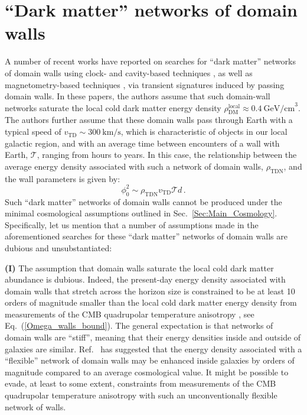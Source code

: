 \documentclass[aps,prd,onecolumn,nofootinbib]{revtex4-2} %
\begin{document}
\vspace{200mm}



\section{``Dark matter'' networks of domain walls}
\label{Sec:TDM}
A number of recent works have reported on searches for ``dark matter'' networks of domain walls using clock- and cavity-based techniques \cite{Wcislo_2016_TDM-cavity,Roberts_2017_TDM-GPS,Wcislo_2018_TDM-cavity,Roberts_2019_TDM-clocks}, as well as magnetometry-based techniques \cite{Pustelny_GNOME_2013}, via transient signatures induced by passing domain walls. 
In these papers, the authors assume that such domain-wall networks saturate the local cold dark matter energy density $\rho_\textrm{DM}^\textrm{local} \approx 0.4~\textrm{GeV/cm}^3$. 
The authors further assume that these domain walls pass through Earth with a typical speed of $v_\textrm{TD} \sim 300~\textrm{km/s}$, which is characteristic of objects in our local galactic region, and with an average time between encounters of a wall with Earth, $\mathcal{T}$, ranging from hours to years. 
In this case, the relationship between the average energy density associated with such a network of domain walls, $\rho_\textrm{TDN}$, and the wall parameters is given by: 
\begin{equation}
\label{DW_amplitude-TDM_network}
\phi_0^2 \sim \rho_\textrm{TDN} v_\textrm{TD} \mathcal{T} d  \, . 
\end{equation}
Such ``dark matter'' networks of domain walls cannot be produced under the minimal cosmological assumptions outlined in Sec.~\ref{Sec:Main_Cosmology}. 
Specifically, let us mention that a number of assumptions made in the aforementioned searches \cite{Wcislo_2016_TDM-cavity,Roberts_2017_TDM-GPS,Wcislo_2018_TDM-cavity,Roberts_2019_TDM-clocks,Pustelny_GNOME_2013} for these ``dark matter'' networks of domain walls are dubious and unsubstantiated: 


\textbf{(I)} The assumption that domain walls saturate the local cold dark matter abundance is dubious. 
Indeed, the present-day energy density associated with domain walls that stretch across the horizon size is constrained to be at least 10 orders of magnitude smaller than the local cold dark matter energy density from measurements of the CMB quadrupolar temperature anisotropy \cite{Spergel_1989_walls,Planck2018}, see Eq.~(\ref{Omega_walls_bound}). 
The general expectation is that networks of domain walls are ``stiff'', meaning that their energy densities inside and outside of galaxies are similar. 
Ref.~\cite{Pospelov_2013_TDM-magnetometers} has suggested that the energy density associated with a ``flexible'' network of domain walls may be enhanced inside galaxies by orders of magnitude compared to an average cosmological value. 
It might be possible to evade, at least to some extent, constraints from measurements of the CMB quadrupolar temperature anisotropy with such an unconventionally flexible network of walls. 
\end{document}
